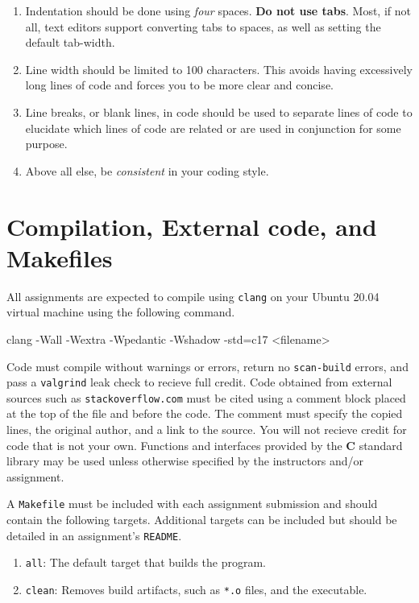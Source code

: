 \documentclass[11pt]{article}
\begin{document}
\begin{enumerate}
  \item Indentation should be done using \emph{four} spaces. \textbf{Do not use tabs}.
    Most, if not all, text editors support converting tabs to spaces, as well as
    setting the default tab-width.

  \item Line width should be limited to 100 characters. This avoids having
    excessively long lines of code and forces you to be more clear and concise.

  \item Line breaks, or blank lines, in code should be used to separate lines of
    code to elucidate which lines of code are related or are used in conjunction
    for some purpose.

  \item Above all else, be \emph{consistent} in your coding style.
\end{enumerate}


\section{Compilation, External code, and Makefiles}

All assignments are expected to compile using \texttt{clang} on your Ubuntu
20.04 virtual machine using the following command.

\begin{codelisting}{}
clang -Wall -Wextra -Wpedantic -Wshadow -std=c17 <filename>
\end{codelisting}

\noindent Code must compile without warnings or errors, return no
\texttt{scan-build} errors, and pass a \texttt{valgrind} leak check to recieve
full credit.
Code obtained from external sources such as \texttt{stackoverflow.com} must be
cited using a comment block placed at the top of the file and before the code. The comment must specify
the copied lines, the original author, and a link to the source. You will not
recieve credit for code that is not your own. Functions and interfaces provided
by the \textbf{C} standard library may be used unless otherwise specified by the
instructors and/or assignment.

A \texttt{Makefile} must be included with each assignment submission and should
contain the following targets.  Additional targets can be included but should be
detailed in an assignment's \texttt{README}.
\begin{enumerate}
  \item \texttt{all}: The default target that builds the program.
  \item \texttt{clean}: Removes build artifacts, such as \texttt{*.o} files, and the executable.
\end{enumerate}
\end{document}
